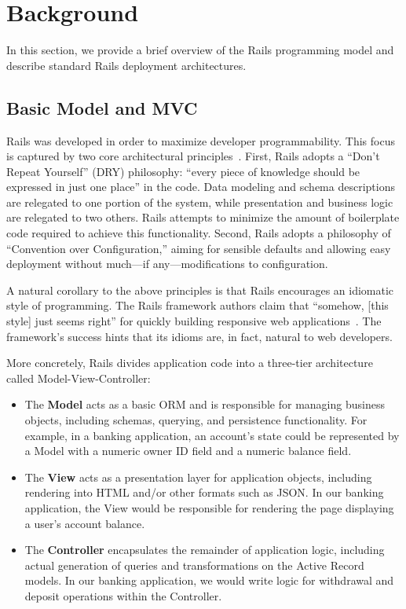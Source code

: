 
\section{Background}
\label{sec:motivation}

In this section, we provide a brief overview of the Rails programming model and describe standard Rails deployment architectures.

\subsection{Basic Model and MVC}

Rails was developed in order to maximize developer programmability. This focus is captured by two core architectural principles~\cite{rails-book}. First, Rails adopts a ``Don't Repeat Yourself'' (DRY) philosophy: ``every piece of knowledge should be expressed in just one place'' in the code. Data modeling and schema descriptions are relegated to one portion of the system, while presentation and business logic are relegated to two others. Rails attempts to minimize the amount of boilerplate code required to achieve this functionality. Second, Rails adopts a philosophy of ``Convention over Configuration,'' aiming for sensible defaults and allowing easy deployment without much---if any---modifications to configuration.

A natural corollary to the above principles is that Rails encourages an idiomatic style of programming. The Rails framework authors claim that ``somehow, [this style] just seems right'' for quickly building responsive web applications~\cite{rails-book}. The framework's success hints that its idioms are, in fact, natural to web developers.

More concretely, Rails divides application code into a three-tier architecture called Model-View-Controller:

\begin{itemize}
\item The \textbf{Model} acts as a basic ORM and is responsible for managing business objects, including schemas, querying, and persistence functionality. For example, in a banking application, an account's state could be represented by a Model with a numeric owner ID field and a numeric balance field.

\item The \textbf{View} acts as a presentation layer for application objects, including rendering into HTML and/or other formats such as JSON. In our banking application, the View would be responsible for rendering the page displaying a user's account balance.

\item The \textbf{Controller} encapsulates the remainder of application logic, including actual generation of queries and transformations on the Active Record models. In our banking application, we would write logic for withdrawal and deposit operations within the Controller.
\end{itemize}

